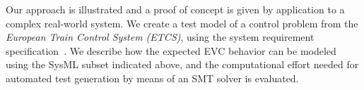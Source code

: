 Our approach is illustrated and a proof of concept is given by application to a complex real-world system.
We create a test model of a  control problem from the
\emph{European Train Control System (ETCS)}, using the system requirement specification~\cite{ETCSSRS-Principles}. We describe how the expected EVC behavior can be modeled using the SysML subset indicated above, and the computational effort needed for automated test  generation by means of 
an SMT solver is evaluated. 





